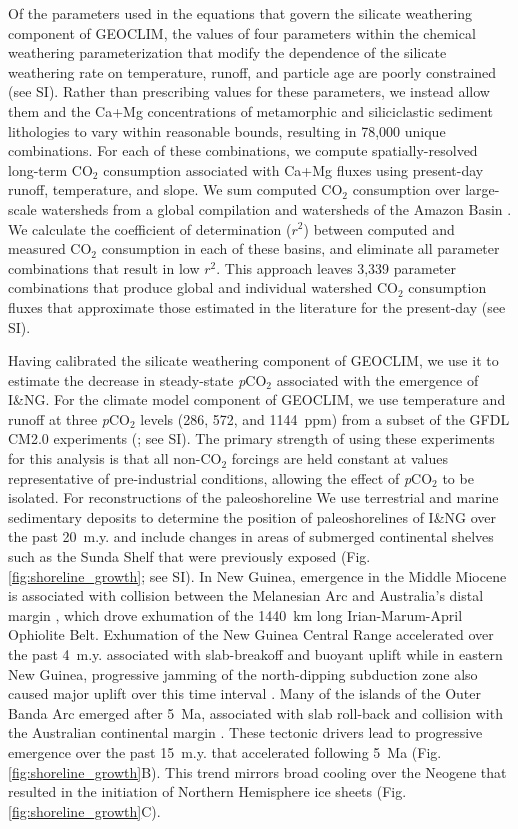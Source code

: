 \documentclass[11pt,letterpaper]{article}
\newcommand{\pCOtwo}{\textit{p}CO$_{2}$\xspace}
\newcommand{\COtwo}{CO$_{2}$\xspace}
\begin{document}
Of the parameters used in the equations that govern the silicate weathering component of GEOCLIM, the values of four parameters within the chemical weathering parameterization \cite{West2012a} that modify the dependence of the silicate weathering rate on temperature, runoff, and particle age are poorly constrained (see SI). Rather than prescribing values for these parameters, we instead allow them and the Ca+Mg concentrations of metamorphic and siliciclastic sediment lithologies to vary within reasonable bounds, resulting in 78,000 unique combinations. For each of these combinations, we compute spatially-resolved long-term \COtwo consumption associated with Ca+Mg fluxes using present-day runoff, temperature, and slope. We sum computed \COtwo consumption over large-scale watersheds from a global compilation\cite{Gaillardet1999a} and watersheds of the Amazon Basin \cite{Moquet2018a}. We calculate the coefficient of determination ($r^{2}$) between computed and measured \COtwo consumption in each of these basins, and eliminate all parameter combinations that result in low $r^{2}$. This approach leaves 3,339 parameter combinations that produce global and individual watershed \COtwo consumption fluxes that approximate those estimated in the literature for the present-day (see SI).

Having calibrated the silicate weathering component of GEOCLIM, we use it to estimate the decrease in steady-state \pCOtwo associated with the emergence of I\&NG. For the climate model component of GEOCLIM, we use temperature and runoff at three \pCOtwo levels (286, 572, and 1144~ppm) from a subset of the GFDL CM2.0 experiments (\citealp{Delworth2006a, Delworth2006b}; see SI). The primary strength of using these experiments for this analysis is that all non-\COtwo forcings are held constant at values representative of pre-industrial conditions, allowing the effect of \pCOtwo to be isolated. For reconstructions of the paleoshoreline  We use terrestrial and marine sedimentary deposits to determine the position of paleoshorelines of I\&NG over the past 20~m.y. and include changes in areas of submerged continental shelves such as the Sunda Shelf that were previously exposed (Fig. \ref{fig:shoreline_growth}; see SI). In New Guinea, emergence in the Middle Miocene is associated with collision between the Melanesian Arc and Australia's distal margin \cite{vanUfford2005a, Cloos2005a, Baldwin2012a}, which drove exhumation of the 1440~km long Irian-Marum-April Ophiolite Belt. Exhumation of the New Guinea Central Range accelerated over the past 4~m.y. associated with slab-breakoff and buoyant uplift \cite{Cloos2005a} while in eastern New Guinea, progressive jamming of the north-dipping subduction zone also caused major uplift over this time interval \cite{vanUfford2005a}. Many of the islands of the Outer Banda Arc emerged after 5~Ma, associated with slab roll-back and collision with the Australian continental margin \cite{Harris2006a, Hall2013b}. These tectonic drivers lead to progressive emergence over the past 15~m.y. that accelerated following 5~Ma (Fig. \ref{fig:shoreline_growth}B). This trend mirrors broad cooling over the Neogene that resulted in the initiation of Northern Hemisphere ice sheets (Fig. \ref{fig:shoreline_growth}C).
\end{document}
